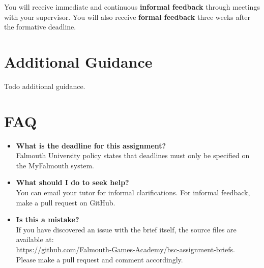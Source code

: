\documentclass{../fal_assignment}
\begin{document}
You will receive immediate and continuous \textbf{informal feedback} through meetings with your supervisor.
You will also receive \textbf{formal feedback} three weeks after the formative deadline.

\section*{Additional Guidance}

Todo additional guidance.

\section*{FAQ}

\begin{itemize}
	\item 	\textbf{What is the deadline for this assignment?} \\ 
    		Falmouth University policy states that deadlines must only be specified on the MyFalmouth system.
    		
	\item 	\textbf{What should I do to seek help?} \\ 
    		You can email your tutor for informal clarifications. For informal feedback, make a pull request on GitHub. 
    		
    	\item 	\textbf{Is this a mistake?} \\ 	
    		If you have discovered an issue with the brief itself, the source files are available at: \\
    		\url{https://github.com/Falmouth-Games-Academy/bsc-assignment-briefs}.\\
    		 Please make a pull request and comment accordingly.
\end{itemize}


\end{document}
